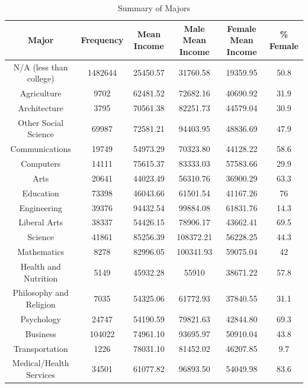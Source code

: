 \documentclass[12pt]{article}
\begin{document}
\begin{landscape}
\begin{center}
\begin{table}[htbp]
\centering
\caption{Summary of Majors}
\begin{tabular}{|c | c c c c c |}
\hline
\textbf{Major} & \textbf{Frequency} & \textbf{Mean Income} & \textbf{Male Mean Income} & \textbf{Female Mean Income} & \textbf{\% Female} \\
\hline
N/A (less than college) & 1482644 & 25450.57 & 31760.58 & 19359.95 & 50.8\\
Agriculture &  9702 & 62481.52 & 72682.16 & 40690.92 & 31.9\\
Architecture &  3795 & 70561.38 & 82251.73 & 44579.04 & 30.9\\
Other Social Science & 69987 & 72581.21 & 94403.95 & 48836.69 & 47.9\\
Communications & 19749 & 54973.29 & 70323.80 & 44128.22 & 58.6\\
Computers & 14111 & 75615.37 & 83333.03 & 57583.66 & 29.9\\
Arts & 20641 & 44023.49 & 56310.76 & 36900.29 & 63.3\\
Education & 73398 & 46043.66 & 61501.54 & 41167.26 & 76\\
Engineering & 39376 & 94432.54 & 99884.08 & 61831.76 & 14.3\\
Liberal Arts & 38337 & 54426.15 & 78906.17 & 43662.41 & 69.5\\
Science & 41861 & 85256.39 & 108372.21 & 56228.25 & 44.3\\
Mathematics & 8278 & 82996.05 & 100341.93 & 59075.04 & 42\\
Health and Nutrition & 5149 & 45932.28 & 55910 & 38671.22 & 57.8\\
Philosophy and Religion & 7035 & 54325.06 & 61772.93 & 37840.55 & 31.1\\
Psychology & 24747 & 54190.59 & 79821.63 & 42844.80 & 69.3\\
Business & 104022 & 74961.10 & 93695.97 & 50910.04 & 43.8\\
Transportation & 1226 & 78031.10 & 81452.02 & 46207.85 & 9.7\\
Medical/Health Services & 34501 & 61077.82 & 96893.50 & 54049.98 & 83.6\\
\hline
\end{tabular}
\end{table}
\end{center}
\end{landscape}
\end{document}
